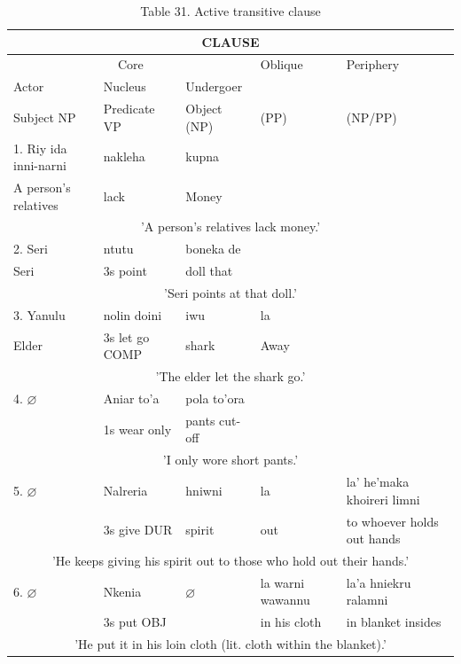 \documentclass[10pt]{article}
\begin{document}
\begin{table}[h]
\begin{center}
\captionsetup{labelformat=empty}
\caption{Table 31. Active transitive clause}
\begin{tabular}{|l|l|l|l|l|}
\hline
\multicolumn{5}{|c|}{CLAUSE} \\
\hline
\multicolumn{3}{|c|}{Core} & Oblique & Periphery \\
\hline
Actor & Nucleus & Undergoer &  &  \\
\hline
Subject NP & Predicate VP & Object (NP) & (PP) & (NP/PP) \\
\hline
1. Riy ida inni-narni & nakleha & kupna &  &  \\
\hline
A person's relatives & lack & Money &  &  \\
\hline
\multicolumn{5}{|c|}{'A person's relatives lack money.'} \\
\hline
2. Seri & ntutu & boneka de &  &  \\
\hline
Seri & 3s point & doll that &  &  \\
\hline
\multicolumn{5}{|c|}{'Seri points at that doll.'} \\
\hline
3. Yanulu & nolin doini & iwu & la &  \\
\hline
Elder & 3s let go COMP & shark & Away &  \\
\hline
\multicolumn{5}{|c|}{'The elder let the shark go.'} \\
\hline
4. \(\varnothing\) & Aniar to'a & pola to'ora &  &  \\
\hline
 & 1s wear only & pants cut-off &  &  \\
\hline
\multicolumn{5}{|c|}{'I only wore short pants.'} \\
\hline
5. \(\varnothing\) & Nalreria & hniwni & la & la' he'maka khoireri limni \\
\hline
 & 3s give DUR & spirit & out & to whoever holds out hands \\
\hline
\multicolumn{5}{|c|}{'He keeps giving his spirit out to those who hold out their hands.'} \\
\hline
6. \(\varnothing\) & Nkenia & \(\varnothing\) & la warni wawannu & la'a hniekru ralamni \\
\hline
 & 3s put OBJ &  & in his cloth & in blanket insides \\
\hline
\multicolumn{5}{|c|}{'He put it in his loin cloth (lit. cloth within the blanket).'} \\
\hline
\end{tabular}
\end{center}
\end{table}
\end{document}
